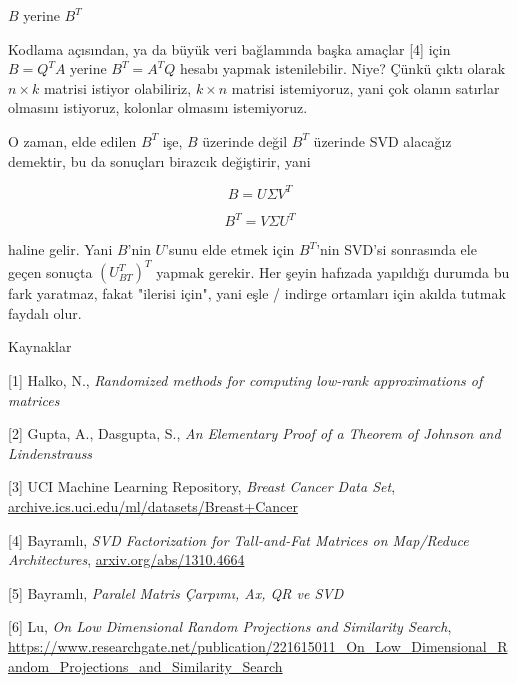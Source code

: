 \documentclass[12pt,fleqn]{article}\usepackage{../../common}
\begin{document}
$B$ yerine $B^T$

Kodlama açısından, ya da büyük veri bağlamında başka amaçlar [4] için
$B = Q^T A$ yerine $B^T = A^T Q$ hesabı yapmak istenilebilir. Niye?
Çünkü çıktı olarak $n \times k$ matrisi istiyor olabiliriz, $k \times
n$ matrisi istemiyoruz, yani çok olanın satırlar olmasını istiyoruz,
kolonlar olmasını istemiyoruz.

O zaman, elde edilen $B^T$ işe, $B$ üzerinde değil $B^T$ üzerinde SVD
alacağız demektir, bu da sonuçları birazcık değiştirir, yani

$$ B = U\Sigma V^T $$

$$ B^T = V\Sigma U^T $$

haline gelir. Yani $B$'nin $U$'sunu elde etmek için $B^T$'nin SVD'si
sonrasında ele geçen sonuçta $(U_{BT}^T)^T$ yapmak gerekir. Her şeyin
hafızada yapıldığı durumda bu fark yaratmaz, fakat "ilerisi için", yani
eşle / indirge ortamları için akılda tutmak faydalı olur.

Kaynaklar

[1] Halko, N., {\em Randomized methods for computing low-rank approximations of matrices}

[2] Gupta, A., Dasgupta, S., {\em An Elementary Proof of a Theorem of Johnson and Lindenstrauss}

[3] UCI Machine Learning Repository, 
    {\em Breast Cancer Data Set}, 
    \url{archive.ics.uci.edu/ml/datasets/Breast+Cancer}

[4] Bayramlı, {\em SVD Factorization for Tall-and-Fat Matrices on Map/Reduce Architectures}, 
    \url{arxiv.org/abs/1310.4664}

[5] Bayramlı, {\em Paralel Matris Çarpımı, Ax, QR ve SVD} 

[6] Lu, {\em On Low Dimensional Random Projections and Similarity Search},
    \url{https://www.researchgate.net/publication/221615011_On_Low_Dimensional_Random_Projections_and_Similarity_Search}


    
\end{document}
